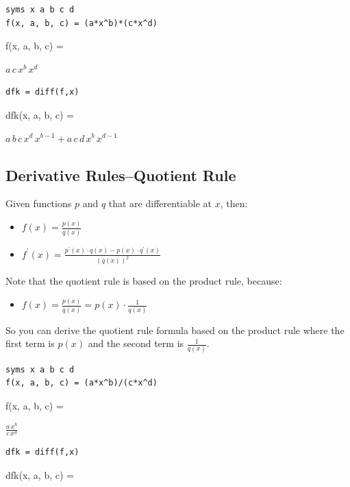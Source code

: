 \documentclass[
]{book}
\providecommand{\tightlist}{%
  \setlength{\itemsep}{0pt}\setlength{\parskip}{0pt}}
\begin{document}
\begin{verbatim}
syms x a b c d
f(x, a, b, c) = (a*x^b)*(c*x^d)
\end{verbatim}

f(x, a, b, c) =

\(\displaystyle a\,c\,x^b \,x^d\)

\begin{verbatim}
dfk = diff(f,x)
\end{verbatim}

dfk(x, a, b, c) =

\(\displaystyle a\,b\,c\,x^d \,x^{b-1} +a\,c\,d\,x^b \,x^{d-1}\)

\hypertarget{derivative-rulesquotient-rule}{%
\subsection{Derivative Rules--Quotient Rule}\label{derivative-rulesquotient-rule}}

Given functions \(p\) and \(q\) that are differentiable at \(x\), then:

\begin{itemize}
\item
  \(\displaystyle f(x)=\frac{p(x)}{q(x)}\)
\item
  \(\displaystyle f^{\prime } (x)=\frac{p^{\prime } (x)\cdot q(x)-p(x)\cdot q^{\prime } (x)}{(q(x))^2 }\)
\end{itemize}

Note that the quotient rule is based on the product rule, because:

\begin{itemize}
\tightlist
\item
  \(\displaystyle f(x)=\frac{p(x)}{q(x)}=p(x)\cdot \frac{1}{q(x)}\)
\end{itemize}

So you can derive the quotient rule formula based on the product rule
where the first term is \(p(x)\) and the second term is \(\frac{1}{q(x)}\).

\begin{verbatim}
syms x a b c d
f(x, a, b, c) = (a*x^b)/(c*x^d)
\end{verbatim}

f(x, a, b, c) =

\(\displaystyle \frac{a\,x^b }{c\,x^d }\)

\begin{verbatim}
dfk = diff(f,x)
\end{verbatim}

dfk(x, a, b, c) =
\end{document}
